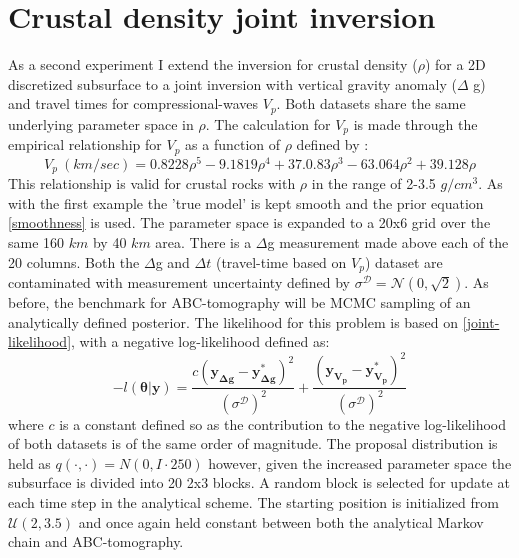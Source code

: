 \section{Crustal density joint inversion}

As a second experiment I extend the inversion for crustal density ($\rho$) for a 2D discretized subsurface to a joint inversion with vertical gravity anomaly ($\Delta$ g) and travel times for compressional-waves $V_p$. Both datasets share the same underlying parameter space in $\rho$. The calculation for $V_p$ is made through the empirical relationship for $V_p$ as a function of $\rho$ defined by \citet{Brocher2005}:
\begin{equation}
	V_p\ (km/sec) = 0.8228\rho^5 - 9.1819\rho^4 + 37.0.83\rho^3 - 63.064\rho^2 + 39.128\rho
	\label{rhotovp}
\end{equation}
This relationship is valid for crustal rocks with $\rho$ in the range of 2-3.5 $g/cm^3$. As with the first example the 'true model' is kept smooth and the prior equation \ref{smoothness} is used. The parameter space is expanded to a 20x6 grid over the same 160 $km$ by 40 $km$ area. There is a $\Delta$g measurement made above each of the 20 columns. Both the $\Delta$g and $\Delta t$ (travel-time based on $V_p$) dataset are contaminated with measurement uncertainty defined by $\sigma^{\mathcal{D}} = \mathcal{N}(0,\sqrt{2})$. As before, the benchmark for ABC-tomography will be MCMC sampling of an analytically defined posterior. The likelihood for this problem is based on \ref{joint-likelihood}, with a negative log-likelihood defined as:
\begin{equation}
	-l(\bm{\theta}|\bm{y}) = \frac{c(\bm{y_{\Delta g}}-\bm{y^*_{\Delta g}})^2}{(\sigma^{\mathcal{D}})^2} + \frac{(\bm{y_{V_p}}-\bm{y^*_{V_p}})^2}{(\sigma^{\mathcal{D}})^2}
\end{equation}
where $c$ is a constant defined so as the contribution to the negative log-likelihood of both datasets is of the same order of magnitude. The proposal distribution is held as $q(\cdot,\cdot) = N(0,I\cdot250)$ however, given the increased parameter space the subsurface is divided into 20 2x3 blocks. A random block is selected for update at each time step in the analytical scheme. The starting position is initialized from $\mathcal{U}(2,3.5)$  and once again held constant between both the analytical Markov chain and ABC-tomography. \par

